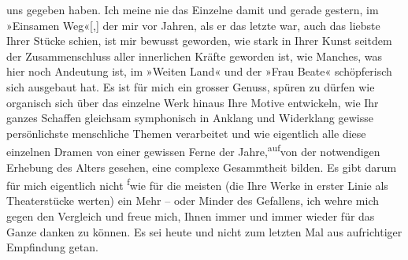                uns gegeben haben. Ich meine nie das Einzelne damit und gerade gestern,
               im »Einsamen Weg«{[},{]} der mir vor Jahren, als er das
               letzte war, auch das liebste Ihrer Stücke schien, ist mir bewusst geworden, wie stark
               in Ihrer Kunst seitdem der Zusammenschluss aller innerlichen Kräfte geworden ist, wie
               Manches, was hier noch Andeutung ist, im »Weiten
                  Land« und der »Frau Beate« schöpferisch
                   sich ausgebaut hat. Es ist für mich ein grosser
               Genuss, spüren zu dürfen wie organisch sich über das einzelne Werk hinaus Ihre Motive
               entwickeln, wie Ihr ganzes Schaffen gleichsam {\pb}symphonisch in Anklang und Widerklang
                   gewisse persönlichste menschliche Themen
               verarbeitet und wie eigentlich alle diese einzelnen Dramen von einer gewissen Ferne
               der Jahre,\substVorne{}\textsuperscript{auf}\substDazwischen{}von\substHinten{} der notwendigen Erhebung des Alters gesehen, eine complexe Gesammtheit
               bilden. Es gibt darum für mich eigentlich nicht \substVorne{}\textsuperscript{f}\substDazwischen{}w\substHinten{}ie für die meisten (die Ihre Werke in erster Linie als Theaterstücke werten)
               ein Mehr – oder Minder des Gefallens, ich wehre mich gegen den Vergleich und freue
               mich, Ihnen immer und immer wieder für das Ganze danken zu können. Es sei
                  heute und nicht zum letzten Mal aus aufrichtiger Empfindung
               getan.\pend
           
